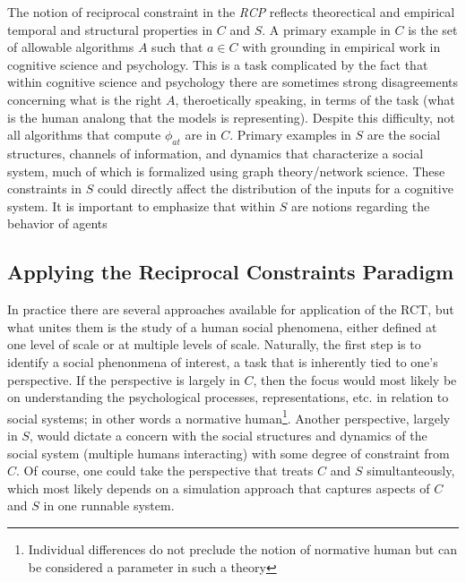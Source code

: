 \documentclass{article}
\begin{document}
The notion of reciprocal constraint in the \textit{RCP} reflects theorectical and empirical temporal and structural properties in $C$ and $S$.  A primary example in $C$ is the set of allowable algorithms $A$ such that $a \in C$ with grounding in empirical work in cognitive science and psychology.  This is a task complicated by the fact that within cognitive science and psychology there are sometimes strong disagreements concerning what is the right $A$, theroetically speaking, in terms of the task (what is the human analong that the models is representing).  Despite this difficulty, not all algorithms that compute $\phi_{at}$ are in $C$.  Primary examples in $S$ are the social structures, channels of information, and dynamics that characterize a social system, much of which is formalized using graph theory/network science.  These constraints in $S$ could directly affect the distribution of the inputs for a cognitive system.  It is important to emphasize that within $S$ are notions regarding the behavior of agents   


\subsection{Applying the Reciprocal Constraints Paradigm}   
In practice there are several approaches available for application of the RCT, but what unites them is the study of a human social phenomena, either defined at one level of scale or at multiple levels of scale.  Naturally, the first step is to identify a social phenonmena of interest, a task that is inherently tied to one's perspective.  If the perspective is largely in $C$, then the focus would most likely be on understanding the psychological processes, representations, etc. in relation to social systems; in other words a normative human\footnote{Individual differences do not preclude the notion of normative human but can be considered a parameter in such a theory}.   Another perspective, largely in $S$, would dictate a concern with the social structures and dynamics of the social system (multiple humans interacting) with some degree of constraint from $C$.  Of course, one could take the perspective that treats $C$ and $S$ simultanteously, which most likely depends on a simulation approach that captures aspects of $C$ and $S$ in one runnable system.  
\end{document}
